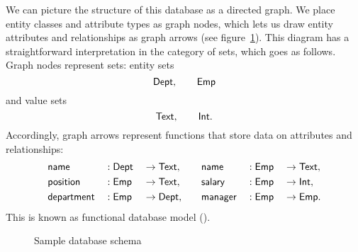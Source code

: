 We can picture the structure of this database as a directed graph.  We place
entity classes and attribute types as graph nodes, which lets us draw entity
attributes and relationships as graph arrows (see
figure~\ref{fig:sample-schema}).  This diagram has a straightforward
interpretation in the category of sets, which goes as follows.  Graph nodes
represent sets: entity sets
\begin{equation*}
    \textup{\textsf{Dept}}, \qquad \textup{\textsf{Emp}}
\end{equation*}
and value sets
\begin{equation*}
    \textup{\textsf{Text}}, \qquad \textup{\textsf{Int}}.
\end{equation*}
Accordingly, graph arrows represent functions that store data on attributes and
relationships:
\begin{alignat*}{6}
    & \textup{\textsf{name}} && : \textup{\textsf{Dept}} && \to \textup{\textsf{Text}}, && \quad \textup{\textsf{name}} && : \textup{\textsf{Emp}} && \to \textup{\textsf{Text}}, \\
    & \textup{\textsf{position}} && : \textup{\textsf{Emp}} && \to \textup{\textsf{Text}}, && \quad \textup{\textsf{salary}} && : \textup{\textsf{Emp}} && \to \textup{\textsf{Int}}, \\
    & \textup{\textsf{department}} && : \textup{\textsf{Emp}} && \to \textup{\textsf{Dept}}, && \quad \textup{\textsf{manager}} && : \textup{\textsf{Emp}} && \to \textup{\textsf{Emp}}.
\end{alignat*}
This is known as functional database model (\cite{Kerschberg1976}).

\begin{figure}
    \label{fig:sample-schema}
    \centering
    \caption{Sample database schema}
\end{figure}

